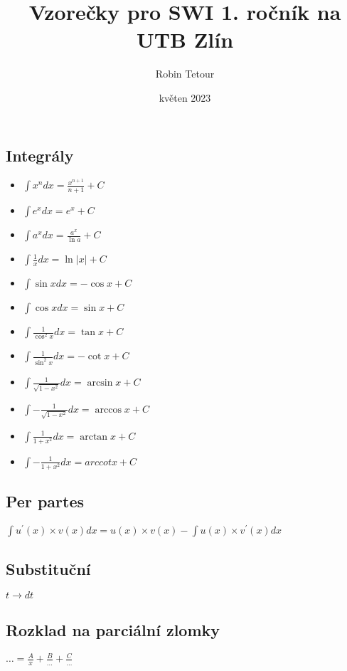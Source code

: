 \documentclass{article}
\title{Vzorečky pro SWI 1. ročník na UTB Zlín}
\author{Robin Tetour}
\date{květen 2023}
\providecommand{\arccot}{arccot}
\begin{document}
\maketitle
\begin{multicols}{2}
\section{Integrály}
\begin{itemize}
    \item $\int x^{n}dx=\frac{x^{n+1}}{n+1}+C$
    \item $\int e^{x}dx=e^{x}+C$
    \item $\int a^{x}dx=\frac{a^{x}}{\ln a}+C$
    \item $\int\frac{1}{x}dx=\ln\left|x\right|+C$
    \item $\int\sin xdx=-\cos x+C$
    \item $\int\cos xdx=\sin x+C$
    \item $\int\frac{1}{\cos^{2}x}dx=\tan x+C$
    \item $\int\frac{1}{\sin^{2}x}dx=-\cot x+C$
    \item $\int\frac{1}{\sqrt{1-x^{2}}}dx=\arcsin x+C$
    \item $\int-\frac{1}{\sqrt{1-x^{2}}}dx=\arccos x+C$
    \item $\int\frac{1}{1+x^{2}}dx=\arctan x+C$
    \item $\int-\frac{1}{1+x^{2}}dx=\arccot x+C$
\end{itemize}
\subsection{Per partes}
$\int u^{\prime}\left(x\right)\times v\left(x\right)dx=u\left(x\right)\times v\left(x\right)-\int u\left(x\right)\times v^{\prime}\left(x\right)dx$
\subsection{Substituční}
$t\rightarrow dt$
\subsection{Rozklad na parciální zlomky}
$\ldots=\frac{A}{x}+\frac{B}{\ldots}+\frac{C}{\ldots}$

\end{multicols}
\end{document}
